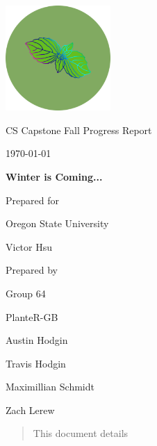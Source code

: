 \documentclass[onecolumn, draftclsnofoot,10pt, compsoc]{IEEEtran}
\def \CapstoneTeamName{			              			 PlanteR-GB}
\def \CapstoneTeamNumber{					           			 Group 64}
\def \GroupMemberOne{				           				Austin Hodgin}
\def \GroupMemberTwo{				           				Travis Hodgin}
\def \GroupMemberThree{			            Maximillian Schmidt}
\def\GroupMemberFour{		        	               Zach Lerew}
\def \CapstoneProjectName{	      	    Winter is Coming...}
\def \CapstoneSponsorCompany{		    Oregon State University}
\def \CapstoneSponsorPerson{		 			  				 Victor Hsu}
\def \DocType{		%
				Fall Progress Report
				}
\newcommand{\NameSigPair}[1]{\par
\makebox[2.75in][r]{#1} \hfil 	\makebox[3.25in]{\makebox[2.25in]{\hrulefill} \hfill		\makebox[.75in]{\hrulefill}}
\par\vspace{-12pt} \textit{\tiny\noindent
\makebox[2.75in]{} \hfil		\makebox[3.25in]{\makebox[2.25in][r]{Signature} \hfill	\makebox[.75in][r]{Date}}}}
\renewcommand{\NameSigPair}[1]{#1}
\begin{document}
\begin{titlepage}
    \begin{singlespace}
        \hfill

        \includegraphics[height=4cm]{logo.png}

        \par\vspace{.2in}
        \centering
        \scshape{
            \huge CS Capstone \DocType \par
            {\large\today}\par
            \vspace{.5in}
            \textbf{\Huge\CapstoneProjectName}\par

						\vspace{1in}

            {\large Prepared for}\par
            \Huge \CapstoneSponsorCompany\par
            \vspace{5pt}
            {\Large\NameSigPair{\CapstoneSponsorPerson}\par}

						\vspace{1in}

            {\large Prepared by}\par
						{\huge \CapstoneTeamNumber}\par
            \CapstoneTeamName\par
            \vspace{5pt}

            {
							\Large
							\NameSigPair{\GroupMemberOne}\par
							\NameSigPair{\GroupMemberTwo}\par
							\NameSigPair{\GroupMemberThree}\par
							\NameSigPair{\GroupMemberFour}\par
            }

            \vspace{20pt}
        }
				\newpage
        \begin{abstract}
				\noindent This document details
        \end{abstract}
    \end{singlespace}
\end{titlepage}
\end{document}
